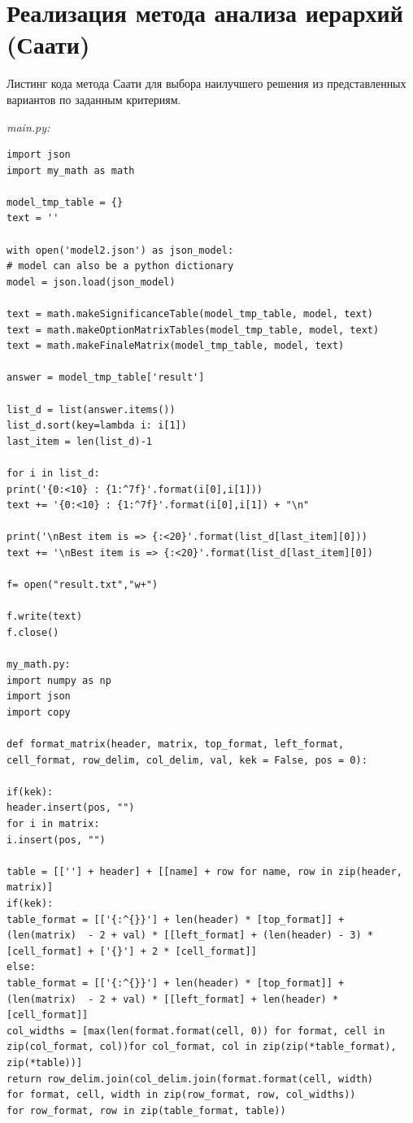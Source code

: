 

\chapter{Реализация метода анализа иерархий (Саати)}
\label{appendix:methodSaati}
Листинг кода метода Саати для выбора наилучшего решения из представленных вариантов по заданным критериям.

\textit{main.py:}
\begin{lstlisting}[breaklines]
import json
import my_math as math

model_tmp_table = {}
text = ''

with open('model2.json') as json_model:
# model can also be a python dictionary
model = json.load(json_model)

text = math.makeSignificanceTable(model_tmp_table, model, text)
text = math.makeOptionMatrixTables(model_tmp_table, model, text)
text = math.makeFinaleMatrix(model_tmp_table, model, text)

answer = model_tmp_table['result']

list_d = list(answer.items())
list_d.sort(key=lambda i: i[1])
last_item = len(list_d)-1

for i in list_d:
print('{0:<10} : {1:^7f}'.format(i[0],i[1]))
text += '{0:<10} : {1:^7f}'.format(i[0],i[1]) + "\n"

print('\nBest item is => {:<20}'.format(list_d[last_item][0]))
text += '\nBest item is => {:<20}'.format(list_d[last_item][0])

f= open("result.txt","w+")

f.write(text)
f.close()

my_math.py:
import numpy as np
import json
import copy

def format_matrix(header, matrix, top_format, left_format, cell_format, row_delim, col_delim, val, kek = False, pos = 0):

if(kek):
header.insert(pos, "")
for i in matrix:
i.insert(pos, "")

table = [[''] + header] + [[name] + row for name, row in zip(header, matrix)]
if(kek):
table_format = [['{:^{}}'] + len(header) * [top_format]] + (len(matrix)  - 2 + val) * [[left_format] + (len(header) - 3) * [cell_format] + ['{}'] + 2 * [cell_format]]
else:
table_format = [['{:^{}}'] + len(header) * [top_format]] + (len(matrix)  - 2 + val) * [[left_format] + len(header) * [cell_format]]
col_widths = [max(len(format.format(cell, 0)) for format, cell in zip(col_format, col))for col_format, col in zip(zip(*table_format), zip(*table))]
return row_delim.join(col_delim.join(format.format(cell, width) 
for format, cell, width in zip(row_format, row, col_widths)) 
for row_format, row in zip(table_format, table))




\end{lstlisting}
